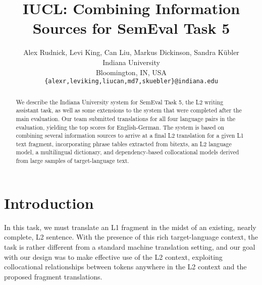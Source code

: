\documentclass[11pt,a4paper]{article}
\title{IUCL: Combining Information Sources for SemEval Task 5}
\author{Alex Rudnick, Levi King, Can Liu, Markus Dickinson, Sandra K\"ubler  \\
  Indiana University \\
  Bloomington, IN, USA \\
  {\tt \{alexr,leviking,liucan,md7,skuebler\}@indiana.edu} }
\date{}
\begin{document}
\maketitle
\begin{abstract}
We describe the Indiana University system for SemEval Task 5, the L2
writing assistant task, as well as some extensions to the system that were
completed after the main evaluation. Our team submitted translations for all
four language pairs in the evaluation, yielding the top scores for
English-German.  The system is based on combining several information sources
to arrive at a final L2 translation for a given L1 text fragment, incorporating
phrase tables extracted from bitexts, an L2 language model, a multilingual
dictionary, and dependency-based collocational models derived from large
samples of target-language text.
\end{abstract}


\section{Introduction}


In this task, we must translate an L1 fragment in the midst of an existing,
nearly complete, L2 sentence.  With the presence of this rich target-language
context, the task is rather different from a standard machine translation
setting, and our goal with our design was to make effective use of the L2
context, exploiting collocational relationships between tokens anywhere in the
L2 context and the proposed fragment translations.
\end{document}
